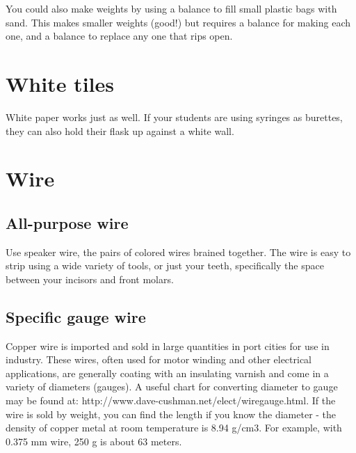 You could also make weights by using a balance 
to fill small plastic bags with sand. 
This makes smaller weights (good!) 
but requires a balance for making each one, 
and a balance to replace any one that rips open.

\section{White tiles}
White paper works just as well. 
If your students are using syringes as burettes, 
they can also hold their flask up against a white wall.

\section{Wire}

\subsection{All-purpose wire}
Use speaker wire, 
the pairs of colored wires brained together. 
The wire is easy to strip using a wide variety of tools, 
or just your teeth, 
specifically the space between your incisors and front molars.

\subsection{Specific gauge wire}
Copper wire is imported and sold in large quantities in port cities 
for use in industry. 
These wires, 
often used for motor winding and other electrical applications, 
are generally coating with an insulating varnish 
and come in a variety of diameters (gauges). 
A useful chart for converting diameter to gauge may be found at: 
http://www.dave-cushman.net/elect/wiregauge.html. 
If the wire is sold by weight, 
you can find the length if you know the diameter - 
the density of copper metal at room temperature is 8.94 g/cm3. 
For example, 
with 0.375 mm wire, 
250 g is about 63 meters.

